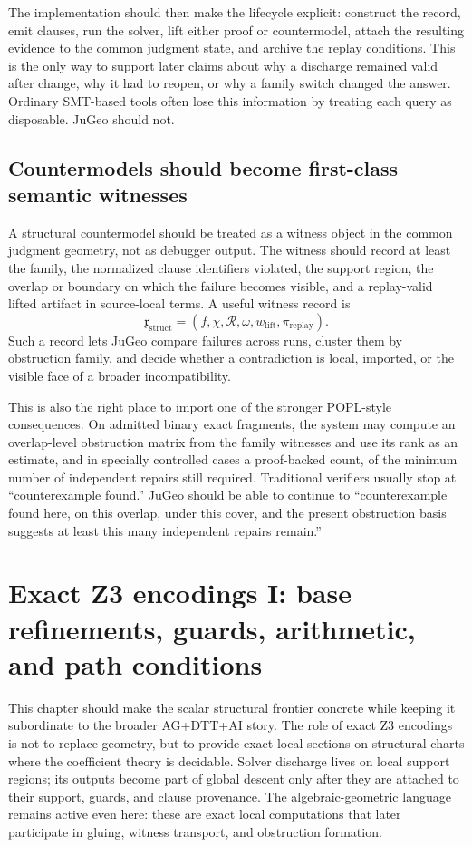 \documentclass[11pt]{report}
\begin{document}
The implementation should then make the lifecycle explicit: construct the record, emit clauses, run the solver, lift either proof or countermodel, attach the resulting evidence to the common judgment state, and archive the replay conditions. This is the only way to support later claims about why a discharge remained valid after change, why it had to reopen, or why a family switch changed the answer. Ordinary SMT-based tools often lose this information by treating each query as disposable. JuGeo should not.

\section{Countermodels should become first-class semantic witnesses}
A structural countermodel should be treated as a witness object in the common judgment geometry, not as debugger output. The witness should record at least the family, the normalized clause identifiers violated, the support region, the overlap or boundary on which the failure becomes visible, and a replay-valid lifted artifact in source-local terms. A useful witness record is
\[
\mathfrak{x}_{\mathrm{struct}}
=
(f, \chi, \mathcal{R}, \omega, w_{\mathrm{lift}}, \pi_{\mathrm{replay}}).
\]
Such a record lets JuGeo compare failures across runs, cluster them by obstruction family, and decide whether a contradiction is local, imported, or the visible face of a broader incompatibility.

This is also the right place to import one of the stronger POPL-style consequences. On admitted binary exact fragments, the system may compute an overlap-level obstruction matrix from the family witnesses and use its rank as an estimate, and in specially controlled cases a proof-backed count, of the minimum number of independent repairs still required. Traditional verifiers usually stop at “counterexample found.” JuGeo should be able to continue to “counterexample found here, on this overlap, under this cover, and the present obstruction basis suggests at least this many independent repairs remain.”

\chapter{Exact Z3 encodings I: base refinements, guards, arithmetic, and path conditions}
This chapter should make the scalar structural frontier concrete while keeping it subordinate to the broader AG+DTT+AI story. The role of exact Z3 encodings is not to replace geometry, but to provide exact local sections on structural charts where the coefficient theory is decidable. Solver discharge lives on local support regions; its outputs become part of global descent only after they are attached to their support, guards, and clause provenance. The algebraic-geometric language remains active even here: these are exact local computations that later participate in gluing, witness transport, and obstruction formation.
\end{document}
